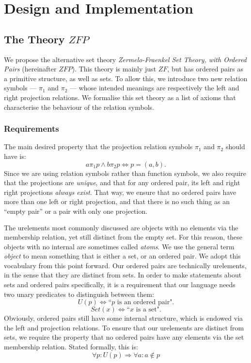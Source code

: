 \documentclass[11pt]{report}
\newcommand{\pleft}{\mathrel{\pi_1}}
\newcommand{\pright}{\mathrel{\pi_2}}
\theoremstyle{definition}
\theoremstyle{theorem}
\theoremstyle{lemma}
\begin{document}
\chapter{Design and Implementation}
\section{The Theory $\mathit{ZFP}$}
We propose the alternative set theory \emph{Zermelo-Fraenkel Set Theory, with Ordered Pairs} (hereinafter $\mathit{ZFP}$).
This theory is mainly just $\mathit{ZF}$, but has ordered pairs as a primitive structure, as well as sets.
To allow this, we introduce two new relation symbols --- $\pleft$ and $\pright$ --- whose intended meanings are respectively the left and right projection relations.
We formalise this set theory as a list of axioms that characterise the behaviour of the relation symbols. 

\subsection{Requirements}\label{zfpreq}
The main desired property that the projection relation symbols $\pleft$ and $\pright$ should have is:
$$a\pleft p \wedge b\pright p \iff p = (a,b).$$ 
Since we are using relation symbols rather than function symbols, we also require that the projections are \emph{unique}, and that for any ordered pair, its left and right right projections \emph{always exist}.
That way, we ensure that no ordered pairs have more than one left or right projection, and that there is no such thing as an ``empty pair'' or a pair with only one projection. 

The urelements most commonly discussed are objects with no elements via the membership relation, yet still distinct from the empty set.
For this reason, these objects with no internal are sometimes called \emph{atoms}. 
We use the general term \emph{object} to mean something that is either a set, or an ordered pair.
We adopt this vocabulary from this point forward.
Our ordered pairs are technically urelements, in the sense that they are distinct from sets.
In order to make statements about sets and ordered pairs specifically, it is a requirement that our language needs two unary predicates to distinguish between them: 
$$U(p) \iff \text{``$p$ is an ordered pair".}$$
$$Set(x) \iff \text{``$x$ is a set".}$$
Obviously, ordered pairs still have some internal structure, which is endowed via the left and projection relations.
To ensure that our urelements are distinct from sets, we require the property that no ordered pairs have any elements via the set membership relation.
Stated formally, this is: 
$$\forall p: U(p) \Rightarrow \forall a: a\notin p$$
\end{document}
